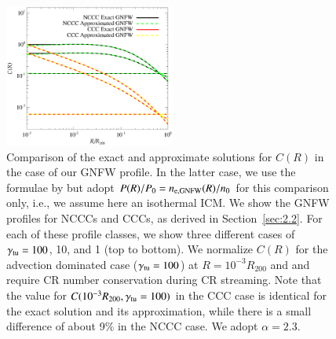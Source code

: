 \documentclass[useAMS,usenatbib]{mn2e}
\begin{document}
\begin{appendix}
\begin{figure}
\centering
\includegraphics[width=0.5\textwidth]{figures/CR_profiles_REXexactVSfake.eps}
\caption{Comparison of the exact and approximate solutions for $C(R)$ in the
  case of our GNFW profile. In the latter case, we use the formulae by
  \protect\cite{2011A&A...527A..99E} but adopt $P(R)/P_{0}=n_{{\mathrm{e,GNFW}}}(R)/n_{0}$
  for this comparison only, i.e., we assume here an isothermal ICM. We show the GNFW
  profiles for NCCCs and CCCs, as derived in Section~\ref{sec:2.2}. For each of
  these profile classes, we show three different cases of
  $\gamma_{{\mathrm{tu}}}=100$, 10, and 1 (top to bottom). We normalize $C(R)$ for
  the advection dominated case ($\gamma_{{\mathrm{tu}}}=100$) at $R=10^{-3}R_{200}$
  and and require CR number conservation during CR streaming. Note that the
  value for $C(10^{-3}R_{200},\gamma_{{\mathrm{tu}}}=100)$ in the CCC case is
  identical for the exact solution and its approximation, while there is a small
  difference of about 9\% in the NCCC case. We adopt $\alpha=2.3$.}
\label{fig:REXexactVSfake}
\end{figure}


\end{appendix}
\end{document}

